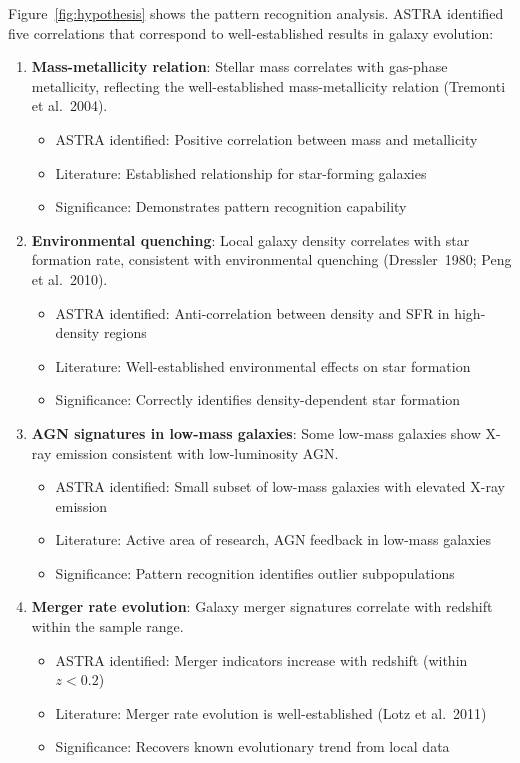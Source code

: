 \documentclass[usenatbib]{rasti}
\begin{document}
Figure~\ref{fig:hypothesis} shows the pattern recognition analysis. ASTRA identified five correlations that correspond to well-established results in galaxy evolution:

\begin{enumerate}
\item \textbf{Mass-metallicity relation}: Stellar mass correlates with gas-phase metallicity, reflecting the well-established mass-metallicity relation (Tremonti et al.~2004)\cite{tremonti2004}.
   \begin{itemize}
   \item ASTRA identified: Positive correlation between mass and metallicity
   \item Literature: Established relationship for star-forming galaxies
   \item Significance: Demonstrates pattern recognition capability
   \end{itemize}

\item \textbf{Environmental quenching}: Local galaxy density correlates with star formation rate, consistent with environmental quenching (Dressler~1980; Peng et al.~2010)\cite{dressler1980,peng2010}.
   \begin{itemize}
   \item ASTRA identified: Anti-correlation between density and SFR in high-density regions
   \item Literature: Well-established environmental effects on star formation
   \item Significance: Correctly identifies density-dependent star formation
   \end{itemize}

\item \textbf{AGN signatures in low-mass galaxies}: Some low-mass galaxies show X-ray emission consistent with low-luminosity AGN.
   \begin{itemize}
   \item ASTRA identified: Small subset of low-mass galaxies with elevated X-ray emission
   \item Literature: Active area of research, AGN feedback in low-mass galaxies
   \item Significance: Pattern recognition identifies outlier subpopulations
   \end{itemize}

\item \textbf{Merger rate evolution}: Galaxy merger signatures correlate with redshift within the sample range.
   \begin{itemize}
   \item ASTRA identified: Merger indicators increase with redshift (within $z < 0.2$)
   \item Literature: Merger rate evolution is well-established (Lotz et al.~2011)
   \item Significance: Recovers known evolutionary trend from local data
   \end{itemize}


\end{enumerate}
\end{document}
